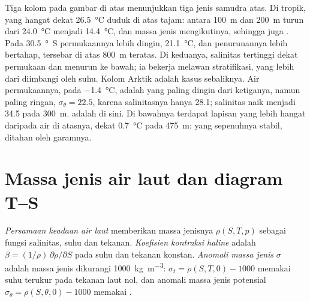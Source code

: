 Tiga kolom pada gambar di atas menunjukkan tiga jenis samudra atas. Di tropik,  yang hangat dekat \qty{26.5}{\celsius} duduk di atas  tajam: antara \qty{100}{m} dan \qty{200}{m}  turun dari \qty{24.0}{\celsius} menjadi \qty{14.4}{\celsius}, dan massa jenis mengikutinya, sehingga  juga . Pada \qty{30.5}{\degree S} permukaannya lebih dingin, \qty{21.1}{\celsius}, dan penurunannya lebih bertahap, tersebar di atas \qty{800}{m} teratas. Di keduanya, salinitas tertinggi dekat permukaan dan menurun ke bawah; ia bekerja melawan stratifikasi, yang lebih dari diimbangi oleh suhu. Kolom Arktik adalah kasus sebaliknya. Air permukaannya, pada \qty{-1.4}{\celsius}, adalah yang paling dingin dari ketiganya, namun paling ringan, $\sigma_\theta = 22.5$, karena salinitasnya hanya \num{28.1}; salinitas naik menjadi \num{34.5} pada \qty{300}{m}.  adalah  di sini. Di bawahnya terdapat lapisan yang lebih hangat daripada air di atasnya, dekat \qty{0.7}{\celsius} pada \qty{475}{m}:  yang sepenuhnya stabil, ditahan oleh garamnya.

\section{Massa jenis air laut dan diagram T--S}\label{sec:b1:fluid-envelopes-structure:ts}

\begin{definition}\label{def:b1:fluid-envelopes-structure:eos}
\emph{Persamaan keadaan air laut} memberikan massa jenisnya $\rho(S, T, p)$ sebagai fungsi salinitas, suhu dan tekanan. \emph{Koefisien kontraksi haline} adalah $\beta = (1/\rho)\,\partial\rho/\partial S$ pada suhu dan tekanan konstan. \emph{Anomali massa jenis} $\sigma$ adalah massa jenis dikurangi \qty{1000}{kg.m^{-3}}: $\sigma_t = \rho(S, T, 0) -
1000$ memakai suhu terukur pada tekanan laut nol, dan anomali massa jenis potensial $\sigma_\theta = \rho(S, \theta, 0) - 1000$ memakai .
\end{definition}

